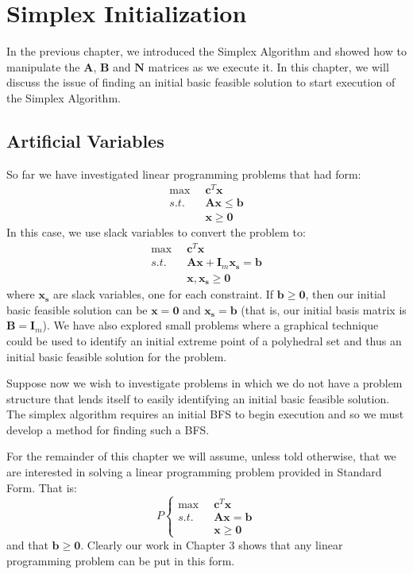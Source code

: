 \chapter{Simplex Initialization}
In the previous chapter, we introduced the Simplex Algorithm and showed how to manipulate the $\mathbf{A}$, $\mathbf{B}$ and $\mathbf{N}$ matrices as we execute it. In this chapter, we will discuss the issue of finding an initial basic feasible solution to start execution of the Simplex Algorithm. 

\section{Artificial Variables}
So far we have investigated linear programming problems that had form:
\begin{displaymath}
\begin{aligned}
\max\;\; & \mathbf{c}^T\mathbf{x}\\
s.t.\;\; & \mathbf{A}\mathbf{x} \leq \mathbf{b}\\
& \mathbf{x} \geq \mathbf{0}
\end{aligned}
\end{displaymath}
In this case, we use slack variables to convert the problem to:
\begin{displaymath}
\begin{aligned}
\max\;\; & \mathbf{c}^T\mathbf{x}\\
s.t.\;\; & \mathbf{A}\mathbf{x} + \mathbf{I}_m \mathbf{x_s}  = \mathbf{b}\\
& \mathbf{x},\mathbf{x_s} \geq \mathbf{0}
\end{aligned}
\end{displaymath}
where $\mathbf{x_s}$ are slack variables, one for each constraint. If $\mathbf{b} \geq \mathbf{0}$, then our initial basic feasible solution can be $\mathbf{x} = \mathbf{0}$ and $\mathbf{x_s} = \mathbf{b}$ (that is, our initial basis matrix is $\mathbf{B} = \mathbf{I}_m$). We have also explored small problems where a graphical technique could be used to identify an initial extreme point of a polyhedral set and thus an initial basic feasible solution for the problem.

Suppose now we wish to investigate problems in which we do not have a problem structure that lends itself to easily identifying an initial basic feasible solution. The simplex algorithm requires an initial BFS to begin execution and so we must develop a method for finding such a BFS. 

For the remainder of this chapter we will assume, unless told otherwise, that we are interested in solving a linear programming problem provided in Standard Form. That is:
\begin{equation}
P\left\{
\begin{aligned}
\max\;\; & \mathbf{c}^T\mathbf{x}\\
s.t.\;\; & \mathbf{A}\mathbf{x} = \mathbf{b}\\
& \mathbf{x} \geq \mathbf{0}
\end{aligned}\right.
\end{equation}
and that $\mathbf{b} \geq \mathbf{0}$. Clearly our work in Chapter 3 shows that any linear programming problem can be put in this form. 

